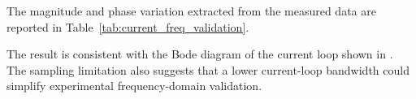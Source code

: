 The magnitude and phase variation extracted from the measured data are reported in
Table~\ref{tab:current_freq_validation}.
\begin{table}[H]
    \centering
    \renewcommand{\arraystretch}{1.6}
    \caption{Frequency-domain validation results at 100 rad/s.}
    \label{tab:current_freq_validation}
\end{table}
The result is consistent with the Bode diagram of the current loop shown in .
The sampling limitation also suggests that a lower current-loop bandwidth could simplify
experimental frequency-domain validation.
